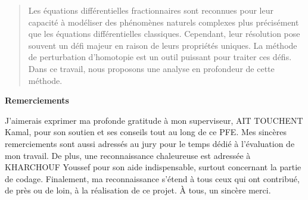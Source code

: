 \begin{abstract}

\noindent
Les équations différentielles fractionnaires sont reconnues pour leur capacité à modéliser des phénomènes naturels complexes plus précisément que les équations différentielles classiques. Cependant, leur résolution pose souvent un défi majeur en raison de leurs propriétés uniques. La méthode de perturbation d'homotopie est un outil puissant pour traiter ces défis. Dans ce travail, nous proposons une analyse en profondeur de cette méthode.
\end{abstract}
\newpage

\vspace*{\fill}

\begin{center}
\textbf{Remerciements}
\end{center}
J'aimerais exprimer ma profonde gratitude à mon superviseur, AIT TOUCHENT Kamal, pour son soutien et ses conseils tout au long de ce PFE. Mes sincères remerciements sont aussi adressés au jury pour le temps dédié à l'évaluation de mon travail. De plus, une reconnaissance chaleureuse est adressée à KHARCHOUF Youssef pour son aide indispensable, surtout concernant la partie de codage. Finalement, ma reconnaissance s'étend à tous ceux qui ont contribué, de près ou de loin, à la réalisation de ce projet. À tous, un sincère merci.
\vspace*{\fill}